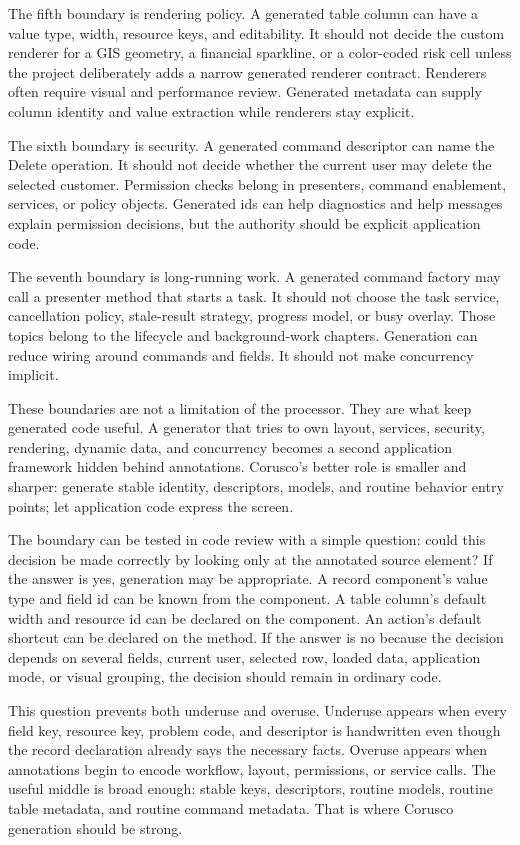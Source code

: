 The fifth boundary is rendering policy. A generated table column can have a
value type, width, resource keys, and editability. It should not decide the
custom renderer for a GIS geometry, a financial sparkline, or a color-coded
risk cell unless the project deliberately adds a narrow generated renderer
contract. Renderers often require visual and performance review. Generated
metadata can supply column identity and value extraction while renderers stay
explicit.

The sixth boundary is security. A generated command descriptor can name the
Delete operation. It should not decide whether the current user may delete the
selected customer. Permission checks belong in presenters, command enablement,
services, or policy objects. Generated ids can help diagnostics and help
messages explain permission decisions, but the authority should be explicit
application code.

The seventh boundary is long-running work. A generated command factory may
call a presenter method that starts a task. It should not choose the task
service, cancellation policy, stale-result strategy, progress model, or busy
overlay. Those topics belong to the lifecycle and background-work chapters.
Generation can reduce wiring around commands and fields. It should not make
concurrency implicit.

These boundaries are not a limitation of the processor. They are what keep
generated code useful. A generator that tries to own layout, services,
security, rendering, dynamic data, and concurrency becomes a second
application framework hidden behind annotations. Corusco's better role is
smaller and sharper: generate stable identity, descriptors, models, and
routine behavior entry points; let application code express the screen.

The boundary can be tested in code review with a simple question: could this
decision be made correctly by looking only at the annotated source element?
If the answer is yes, generation may be appropriate. A record component's
value type and field id can be known from the component. A table column's
default width and resource id can be declared on the component. An action's
default shortcut can be declared on the method. If the answer is no because
the decision depends on several fields, current user, selected row, loaded
data, application mode, or visual grouping, the decision should remain in
ordinary code.

This question prevents both underuse and overuse. Underuse appears when every
field key, resource key, problem code, and descriptor is handwritten even
though the record declaration already says the necessary facts. Overuse
appears when annotations begin to encode workflow, layout, permissions, or
service calls. The useful middle is broad enough: stable keys, descriptors,
routine models, routine table metadata, and routine command metadata. That is
where Corusco generation should be strong.

